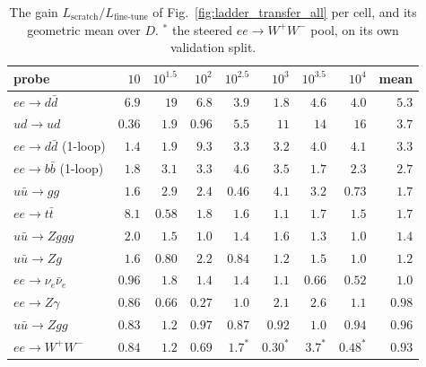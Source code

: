 \documentclass[11pt]{article}
\begin{document}
\begin{table}[H]
\centering
\caption{The gain $L_\text{scratch}/L_\text{fine-tune}$ of Fig.~\ref{fig:ladder_transfer_all} per cell, and its
geometric mean over $D$. $^\ast$ the steered $ee\to W^+W^-$ pool, on its own validation split.}
\label{tab:ladder_transfer_all}
\small
\begin{tabular}{@{}lrrrrrrrr@{}}
\toprule
probe & $10$ & $10^{1.5}$ & $10^2$ & $10^{2.5}$ & $10^3$ & $10^{3.5}$ & $10^4$ & mean \\
\midrule
$ee\to d\bar d$ & $6.9$ & $19$ & $6.8$ & $3.9$ & $1.8$ & $4.6$ & $4.0$ & $5.3$ \\
$ud\to ud$ & $0.36$ & $1.9$ & $0.96$ & $5.5$ & $11$ & $14$ & $16$ & $3.7$ \\
$ee\to d\bar d$ (1-loop) & $1.4$ & $1.9$ & $9.3$ & $3.3$ & $3.2$ & $4.0$ & $4.1$ & $3.3$ \\
$ee\to b\bar b$ (1-loop) & $1.8$ & $3.1$ & $3.3$ & $4.6$ & $3.5$ & $1.7$ & $2.3$ & $2.7$ \\
$u\bar u\to gg$ & $1.6$ & $2.9$ & $2.4$ & $0.46$ & $4.1$ & $3.2$ & $0.73$ & $1.7$ \\
$ee\to t\bar t$ & $8.1$ & $0.58$ & $1.8$ & $1.6$ & $1.1$ & $1.7$ & $1.5$ & $1.7$ \\
$u\bar u\to Zggg$ & $2.0$ & $1.5$ & $1.0$ & $1.4$ & $1.6$ & $1.3$ & $1.0$ & $1.4$ \\
$u\bar u\to Zg$ & $1.6$ & $0.80$ & $2.2$ & $0.84$ & $1.2$ & $1.5$ & $1.0$ & $1.2$ \\
$ee\to\nu_e\bar\nu_e$ & $0.96$ & $1.8$ & $1.4$ & $1.4$ & $1.1$ & $0.66$ & $0.52$ & $1.0$ \\
$ee\to Z\gamma$ & $0.86$ & $0.66$ & $0.27$ & $1.0$ & $2.1$ & $2.6$ & $1.1$ & $0.98$ \\
$u\bar u\to Zgg$ & $0.83$ & $1.2$ & $0.97$ & $0.87$ & $0.92$ & $1.0$ & $0.94$ & $0.96$ \\
$ee\to W^+W^-$ & $0.84$ & $1.2$ & $0.69$ & $1.7^\ast$ & $0.30^\ast$ & $3.7^\ast$ & $0.48^\ast$ & $0.93$ \\
\bottomrule
\end{tabular}
\end{table}
\end{document}

